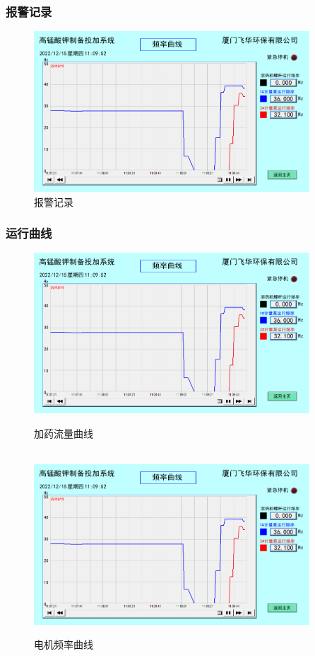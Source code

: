 \documentclass[UTF8,a4paper,12pt,titlepage]{ctexart}
\begin{document}
        \subsubsection{报警记录}
            \begin{figure}[h]
                \centering
                \includegraphics[height=6cm]{g10.PNG}
                \caption{报警记录}\label{fig:g15}
            \end{figure}

        \newpage

        \subsubsection{运行曲线}
            \begin{figure}[h]
                \centering
                \includegraphics[height=6cm]{g10.PNG}
                \caption{加药流量曲线}\label{fig:g16}
               \quad\\ 
                \includegraphics[height=6cm]{g10.PNG}
                \caption{电机频率曲线}\label{fig:g17}
            \end{figure}
\end{document}
